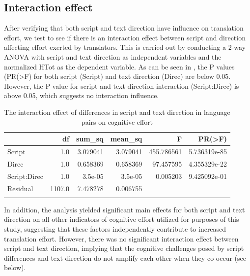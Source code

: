 \documentclass[output=paper]{langscibook}
\begin{document}
\subsection{Interaction effect}

After verifying that both script and text direction have influence on translation effort, we test to see if there is an interaction effect between script and direction affecting effort exerted by translators. This is carried out by conducting a 2-way ANOVA with script and text direction as independent variables and the normalized HTot as the dependent variable. As can be seen in , the P values (PR(>F) for both script (Script) and text direction (Direc) are below 0.05. However, the P value for script and text direction interaction (Script:Direc) is above 0.05, which suggests no interaction influence.

\begin{table}
\begin{tabularx}{\textwidth}{Xrrrrr}
\lsptoprule
 & { df} & { sum\_sq} & { mean\_sq} & { F} & { PR(>F)}\\
 \midrule
{ Script} & {{1.0}} & {{3.079041}} & {{3.079041}} & {{455.786561}} & {{5.736319e-85}}\\
{ Direc} & {{1.0}} & {{0.658369}} & {{0.658369}} & {{97.457595}} & {{4.355329e-22}}\\
{ Script:Direc} & {{1.0}} & {{3.5e-05}} & {{3.5e-05}} & {{0.005203}} & {{9.425092e-01}}\\
{ Residual} & {{1107.0}} & {{7.478278}} & {{0.006755}} &  & \\
\lspbottomrule
\end{tabularx}
\caption{\label{tab:saedi:3}The interaction effect of differences in script and text direction in language pairs on cognitive effort}
\end{table}

In addition, the analysis yielded significant main effects for both script and text direction on all other indicators of cognitive effort utilized for purposes of this study, suggesting that these factors independently contribute to increased translation effort. However, there was no significant interaction effect between script and text direction, implying that the cognitive challenges posed by script differences and text direction do not amplify each other when they co-occur (see  below).
\end{document}
